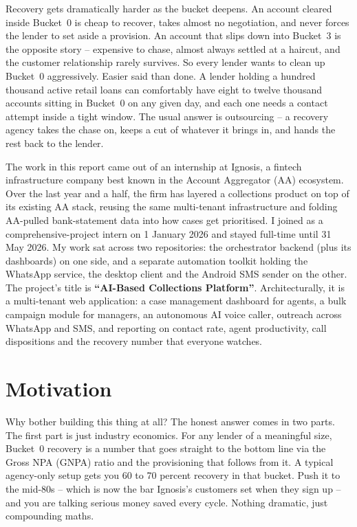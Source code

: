 Recovery gets dramatically harder as the bucket deepens. An account cleared inside Bucket~0 is cheap to recover, takes almost no negotiation, and never forces the lender to set aside a provision. An account that slips down into Bucket~3 is the opposite story -- expensive to chase, almost always settled at a haircut, and the customer relationship rarely survives. So every lender wants to clean up Bucket~0 aggressively. Easier said than done. A lender holding a hundred thousand active retail loans can comfortably have eight to twelve thousand accounts sitting in Bucket~0 on any given day, and each one needs a contact attempt inside a tight window. The usual answer is outsourcing -- a recovery agency takes the chase on, keeps a cut of whatever it brings in, and hands the rest back to the lender.

The work in this report came out of an internship at Ignosis, a fintech infrastructure company best known in the Account Aggregator (AA) ecosystem. Over the last year and a half, the firm has layered a collections product on top of its existing AA stack, reusing the same multi-tenant infrastructure and folding AA-pulled bank-statement data into how cases get prioritised. I joined as a comprehensive-project intern on 1 January 2026 and stayed full-time until 31 May 2026. My work sat across two repositories: the orchestrator backend (plus its dashboards) on one side, and a separate automation toolkit holding the WhatsApp service, the desktop client and the Android SMS sender on the other. The project's title is \textbf{``AI-Based Collections Platform''}. Architecturally, it is a multi-tenant web application: a case management dashboard for agents, a bulk campaign module for managers, an autonomous AI voice caller, outreach across WhatsApp and SMS, and reporting on contact rate, agent productivity, call dispositions and the recovery number that everyone watches.

\section{Motivation}
Why bother building this thing at all? The honest answer comes in two parts. The first part is just industry economics. For any lender of a meaningful size, Bucket~0 recovery is a number that goes straight to the bottom line via the Gross NPA (GNPA) ratio and the provisioning that follows from it. A typical agency-only setup gets you 60 to 70 percent recovery in that bucket. Push it to the mid-80s -- which is now the bar Ignosis's customers set when they sign up -- and you are talking serious money saved every cycle. Nothing dramatic, just compounding maths.

